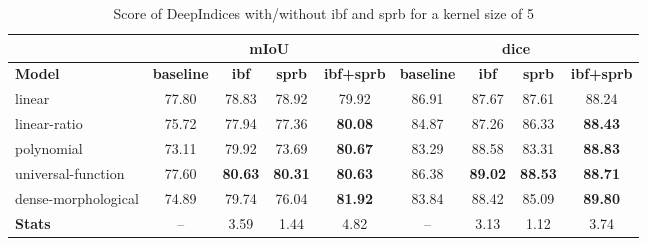 \documentclass[../thesis.tex]{subfiles}
\begin{document}
	\begin{table}[H]
		\centering
		\small
		\begin{tabular} {|l| |c|c|c|c||c|c|c|c|}
			\hline & \multicolumn{4}{c||}{\textbf{mIoU}} & \multicolumn{4}{|c|}{\textbf{dice}} \\
			\hline \textbf{Model} & \textbf{baseline} &	\textbf{ibf} &	\textbf{sprb} &	\textbf{ibf+sprb}  &	\textbf{baseline}  &	\textbf{ibf} &	\textbf{sprb} &	\textbf{ibf+sprb}  \\ \hline
			linear &     77.80 &  78.83 &  78.92 &     79.92 &     86.91 &  87.67 &  87.61 &     88.24 \\
			linear-ratio &     75.72 &  77.94 &  77.36 &     \textbf{80.08} &     84.87 &  87.26 &  86.33 &     \textbf{88.43} \\
			polynomial &     73.11 &  79.92 &  73.69 &     \textbf{80.67} &     83.29 &  88.58 &  83.31 &     \textbf{88.83} \\
			universal-function &     77.60 &  \textbf{80.63} &     \textbf{80.31} &     \textbf{80.63} &     86.38 &  \textbf{89.02} &  \textbf{88.53} &     \textbf{88.71} \\
			dense-morphological &     74.89 &  79.74 &  76.04 &     \textbf{81.92} &     83.84 &  88.42 &  85.09 &     \textbf{89.80} \\ \hline
			\textbf{Stats} &       --  &   3.59 &   1.44 &               4.82 &       --  &   3.13 &   1.12 &      3.74 \\
			\hline
		\end{tabular}
		\caption{Score of DeepIndices with/without ibf and sprb for a kernel size of 5}
		\label{tab:generic-score-5}
	\end{table}
	
\end{document}
